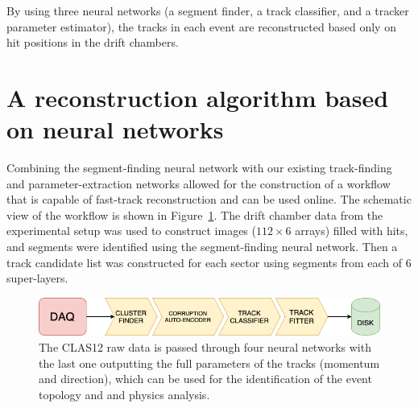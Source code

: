 \documentclass[a4paper,11pt]{article}
\begin{document}
By using three neural networks (a segment finder, a track classifier, and a tracker parameter estimator), the tracks in each event are reconstructed based only on hit positions in the drift chambers. 

\section{A reconstruction algorithm based on neural networks}

Combining the segment-finding neural network with our existing track-finding and parameter-extraction networks allowed for the construction of a workflow that is capable of fast-track reconstruction and can be used online. The schematic view of the workflow is shown in Figure~\ref{fig:workflow}.
The drift chamber data from the experimental setup was used to construct images ($112\times6$ arrays) filled with hits, and segments were identified 
using the segment-finding neural network. Then a track candidate list was constructed for each sector using segments from each of 6 super-layers.

\vspace{0.3in}

\begin{figure}[h!]
\centering
\includegraphics[width=0.85\columnwidth]{images/workflow.png}
\caption{The CLAS12 raw data is passed through four neural networks with the last one outputting the full parameters of the tracks (momentum and direction), which can be used for the identification of the event topology and  and physics analysis.} 
\label{fig:workflow}
\end{figure}
\end{document}
